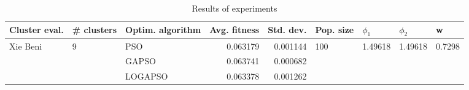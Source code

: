 \begin{table}
\centering
\caption{Results of experiments}
\begin{tabular}{lllrrllll}
\toprule
            Cluster eval. &        \# clusters & Optim. algorithm &  Avg. fitness &  Std. dev. &            Pop. size &               $\phi_{1}$ &               $\phi_{2}$ &                       w \\
\midrule
\multirow{3}{*}{Xie Beni} & \multirow{3}{*}{9} &              PSO &      0.063179 &   0.001144 & \multirow{3}{*}{100} & \multirow{3}{*}{1.49618} & \multirow{3}{*}{1.49618} & \multirow{3}{*}{0.7298} \\
                          &                    &            GAPSO &      0.063741 &   0.000682 &                      &                          &                          &                         \\
                          &                    &          LOGAPSO &      0.063378 &   0.001262 &                      &                          &                          &                         \\
\bottomrule
\end{tabular}
\end{table}
